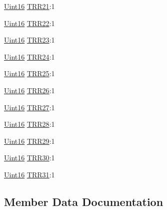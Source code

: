 \begin{DoxyCompactItemize}
\hyperlink{_d_s_p2833x___device_8h_a59a9f6be4562c327cbfb4f7e8e18f08b}{Uint16} \hyperlink{struct_c_a_n_t_r_r___b_i_t_s_a0c33846e815b5b4c6e168c0d543234d1}{T\+R\+R21}\+:1
\item 
\hyperlink{_d_s_p2833x___device_8h_a59a9f6be4562c327cbfb4f7e8e18f08b}{Uint16} \hyperlink{struct_c_a_n_t_r_r___b_i_t_s_af56e46993d4af9c996553f6c5efd14da}{T\+R\+R22}\+:1
\item 
\hyperlink{_d_s_p2833x___device_8h_a59a9f6be4562c327cbfb4f7e8e18f08b}{Uint16} \hyperlink{struct_c_a_n_t_r_r___b_i_t_s_a139335317a6e12b654e2628c81823d33}{T\+R\+R23}\+:1
\item 
\hyperlink{_d_s_p2833x___device_8h_a59a9f6be4562c327cbfb4f7e8e18f08b}{Uint16} \hyperlink{struct_c_a_n_t_r_r___b_i_t_s_a06170d9003725d9fecbfd1acc49017a9}{T\+R\+R24}\+:1
\item 
\hyperlink{_d_s_p2833x___device_8h_a59a9f6be4562c327cbfb4f7e8e18f08b}{Uint16} \hyperlink{struct_c_a_n_t_r_r___b_i_t_s_a7f5f85d72a620a12851da96cfbe11ad5}{T\+R\+R25}\+:1
\item 
\hyperlink{_d_s_p2833x___device_8h_a59a9f6be4562c327cbfb4f7e8e18f08b}{Uint16} \hyperlink{struct_c_a_n_t_r_r___b_i_t_s_ab280139353d1023500d28e60921fb06e}{T\+R\+R26}\+:1
\item 
\hyperlink{_d_s_p2833x___device_8h_a59a9f6be4562c327cbfb4f7e8e18f08b}{Uint16} \hyperlink{struct_c_a_n_t_r_r___b_i_t_s_ad32723dd9b910f7ce1d67f83d23d4b0f}{T\+R\+R27}\+:1
\item 
\hyperlink{_d_s_p2833x___device_8h_a59a9f6be4562c327cbfb4f7e8e18f08b}{Uint16} \hyperlink{struct_c_a_n_t_r_r___b_i_t_s_a04afd06460b277f5e6951386183b42f7}{T\+R\+R28}\+:1
\item 
\hyperlink{_d_s_p2833x___device_8h_a59a9f6be4562c327cbfb4f7e8e18f08b}{Uint16} \hyperlink{struct_c_a_n_t_r_r___b_i_t_s_a0b4d4e976ef57c8839c50269f8adcd14}{T\+R\+R29}\+:1
\item 
\hyperlink{_d_s_p2833x___device_8h_a59a9f6be4562c327cbfb4f7e8e18f08b}{Uint16} \hyperlink{struct_c_a_n_t_r_r___b_i_t_s_a517a2422ccbfea2ce0d1cce323d5cad7}{T\+R\+R30}\+:1
\item 
\hyperlink{_d_s_p2833x___device_8h_a59a9f6be4562c327cbfb4f7e8e18f08b}{Uint16} \hyperlink{struct_c_a_n_t_r_r___b_i_t_s_a76b995907310236858db12de3f70e7a4}{T\+R\+R31}\+:1
\end{DoxyCompactItemize}


\subsection{Member Data Documentation}
\hypertarget{struct_c_a_n_t_r_r___b_i_t_s_aadbc043e1f06b999d33d7e808547245e}{}
